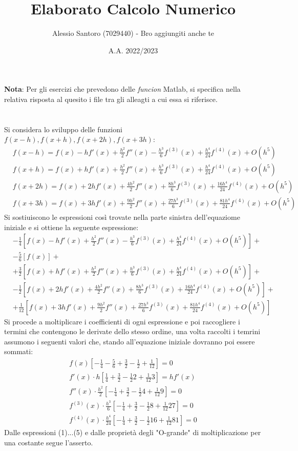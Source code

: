 \documentclass[10pt,a4paper]{article}
\author{Alessio Santoro (7029440) - Bro aggiungiti anche te}
\title{Elaborato Calcolo Numerico}
\date{A.A. 2022/2023}
\begin{document}
\maketitle 	
\textbf{Nota}: Per gli esercizi che prevedono delle \textit{funcion} Matlab, si specifica nella relativa risposta al quesito i file tra gli alleagti a cui essa si riferisce.
\section{}
Si considera lo sviluppo delle funzioni $f(x-h), f(x+h), f(x+2h), f(x+3h)$:
\begin{align*}
&f(x-h)=f(x)-hf'(x)+\frac{h^2}{2}f''(x)-\frac{h^3}{6}f^{(3)}(x)+\frac{h^4}{24}f^{(4)}(x)+O(h^5)\\&f(x+h)=f(x)+hf'(x)+\frac{h^2}{2}f''(x)+\frac{h^3}{6}f^{(3)}(x)+\frac{h^4}{24}f^{(4)}(x)+O(h^5)\\&f(x+2h)=f(x)+2hf'(x)+\frac{4h^2}{2}f''(x)+\frac{8h^3}{6}f^{(3)}(x)+\frac{16h^4}{24}f^{(4)}(x)+O(h^5)\\&f(x+3h)=f(x)+3hf'(x)+\frac{9h^2}{2}f''(x)+\frac{27h^3}{6}f^{(3)}(x)+\frac{81h^4}{24}f^{(4)}(x)+O(h^5)
\end{align*}
Si sostiuiscono le espressioni così trovate nella parte sinistra dell'equaziome iniziale e si ottiene la seguente espressione:
\begin{align*}
&-\frac{1}{4}\left[f(x)-hf'(x)+\frac{h^2}{2}f''(x)-\frac{h^3}{6}f^{(3)}(x)+\frac{h^4}{24}f^{(4)}(x)+O(h^5)\right]+\\&-\frac{5}{6}\left[f(x)\right]+\\&+\frac{3}{2}\left[f(x)+hf'(x)+\frac{h^2}{2}f''(x)+\frac{h^3}{6}f^{(3)}(x)+\frac{h^4}{24}f^{(4)}(x)+O(h^5)\right]+\\&-\frac{1}{2}\left[f(x)+2hf'(x)+\frac{4h^2}{2}f''(x)+\frac{8h^3}{6}f^{(3)}(x)+\frac{16h^4}{24}f^{(4)}(x)+O(h^5)\right]+\\&+\frac{1}{12}\left[f(x)+3hf'(x)+\frac{9h^2}{2}f''(x)+\frac{27h^3}{6}f^{(3)}(x)+\frac{81h^4}{24}f^{(4)}(x)+O(h^5)\right]
\end{align*}
Si procede a moltiplicare i coefficienti di ogni espressione e poi raccogliere i termini che contengono le derivate dello stesso ordine, una volta raccolti i temrini assumono i seguenti valori che, stando all'equazione iniziale dovranno poi essere sommati:
\begin{align}
f(x)\left[-\frac{1}{4}-\frac{5}{6}+\frac{3}{2}-\frac{1}{2}+\frac{1}{12}\right]=0\\	f'(x)\cdot h\left[\frac{1}{4}+\frac{3}{2}-\frac{1}{2}2+\frac{1}{12}3\right]=hf'(x)\\f''(x)\cdot\frac{h^2}{2}\left[-\frac{1}{4}+\frac{3}{2}-\frac{1}{2}4+\frac{1}{12}9\right]=0\\f^{(3)}(x)\cdot\frac{h^3}{6}\left[-\frac{1}{4}+\frac{3}{2}-\frac{1}{2}8+\frac{1}{12}27\right]=0\\f^{(4)}(x)\cdot\frac{h^4}{24}\left[-\frac{1}{4}+\frac{3}{2}-\frac{1}{2}16+\frac{1}{12}81\right]=0
\end{align}
Dalle espressioni (1)...(5) e dalle proprietà degli "O-grande" di moltiplicazione per una costante segue l'asserto.
\end{document}
